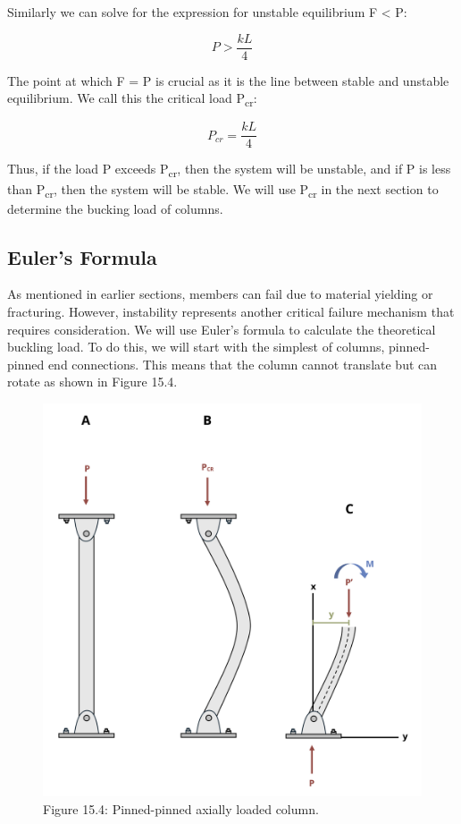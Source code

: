 \documentclass[
  letterpaper,
  DIV=11,
  numbers=noendperiod]{scrreprt}
\theoremstyle{definition}
\theoremstyle{remark}
\begin{document}
Similarly we can solve for the expression for unstable equilibrium F
\textless{} P:

\[
P>\frac{k L}{4}
\]

The point at which F = P is crucial as it is the line between stable and
unstable equilibrium. We call this the critical load
P\textsubscript{cr}:

\[
P_{c r}=\frac{k L}{4}
\]

Thus, if the load P exceeds P\textsubscript{cr}, then the system will be
unstable, and if P is less than P\textsubscript{cr}, then the system
will be stable. We will use P\textsubscript{cr} in the next section to
determine the bucking load of columns.

\subsection{Euler's Formula}\label{eulers-formula}

As mentioned in earlier sections, members can fail due to material
yielding or fracturing. However, instability represents another critical
failure mechanism that requires consideration. We will use Euler's
formula to calculate the theoretical buckling load. To do this, we will
start with the simplest of columns, pinned-pinned end connections. This
means that the column cannot translate but can rotate as shown in Figure
15.4.

\begin{figure}[H]

{\centering \includegraphics{images/CH15s PNGs/figure 15.4.png}

}

\caption{Figure 15.4: Pinned-pinned axially loaded column.}

\end{figure}%
\end{document}
